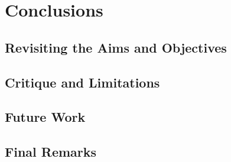\chapter{Conclusions}

\section{Revisiting the Aims and Objectives}

\section{Critique and Limitations}

\section{Future Work}

\section{Final Remarks}
